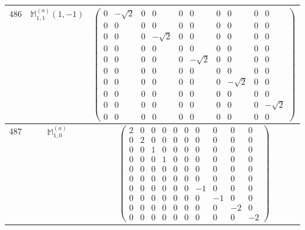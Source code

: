 \documentclass[fleqn,8pt,landscape]{jsarticle}
\begin{document}
\begin{center}
\begin{longtable}{ccc}
$ 486 $ & $ \mathbb{M}_{1,1}^{(a)}(1,-1) $ & $ \begin{pmatrix} 0 & - \sqrt{2} & 0 & 0 & 0 & 0 & 0 & 0 & 0 & 0 \\ 0 & 0 & 0 & 0 & 0 & 0 & 0 & 0 & 0 & 0 \\ 0 & 0 & 0 & - \sqrt{2} & 0 & 0 & 0 & 0 & 0 & 0 \\ 0 & 0 & 0 & 0 & 0 & 0 & 0 & 0 & 0 & 0 \\ 0 & 0 & 0 & 0 & 0 & - \sqrt{2} & 0 & 0 & 0 & 0 \\ 0 & 0 & 0 & 0 & 0 & 0 & 0 & 0 & 0 & 0 \\ 0 & 0 & 0 & 0 & 0 & 0 & 0 & - \sqrt{2} & 0 & 0 \\ 0 & 0 & 0 & 0 & 0 & 0 & 0 & 0 & 0 & 0 \\ 0 & 0 & 0 & 0 & 0 & 0 & 0 & 0 & 0 & - \sqrt{2} \\ 0 & 0 & 0 & 0 & 0 & 0 & 0 & 0 & 0 & 0 \end{pmatrix} $ \\ \hline
$ 487 $ & $ \mathbb{M}_{1,0}^{(a)} $ & $ \begin{pmatrix} 2 & 0 & 0 & 0 & 0 & 0 & 0 & 0 & 0 & 0 \\ 0 & 2 & 0 & 0 & 0 & 0 & 0 & 0 & 0 & 0 \\ 0 & 0 & 1 & 0 & 0 & 0 & 0 & 0 & 0 & 0 \\ 0 & 0 & 0 & 1 & 0 & 0 & 0 & 0 & 0 & 0 \\ 0 & 0 & 0 & 0 & 0 & 0 & 0 & 0 & 0 & 0 \\ 0 & 0 & 0 & 0 & 0 & 0 & 0 & 0 & 0 & 0 \\ 0 & 0 & 0 & 0 & 0 & 0 & -1 & 0 & 0 & 0 \\ 0 & 0 & 0 & 0 & 0 & 0 & 0 & -1 & 0 & 0 \\ 0 & 0 & 0 & 0 & 0 & 0 & 0 & 0 & -2 & 0 \\ 0 & 0 & 0 & 0 & 0 & 0 & 0 & 0 & 0 & -2 \end{pmatrix} $ \\ \hline

\end{longtable}
\end{center}
\end{document}
